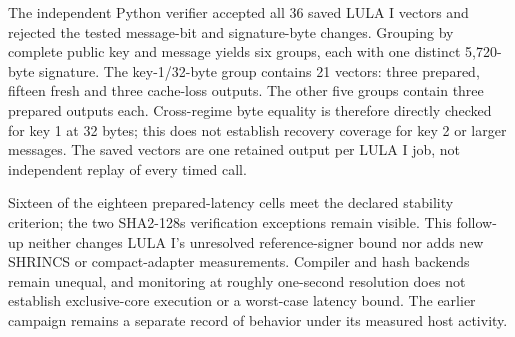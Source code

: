 The independent Python verifier accepted all 36 saved LULA I vectors and rejected the tested message-bit and signature-byte changes. Grouping by complete public key and message yields six groups, each with one distinct 5,720-byte signature. The key-1/32-byte group contains 21 vectors: three prepared, fifteen fresh and three cache-loss outputs. The other five groups contain three prepared outputs each. Cross-regime byte equality is therefore directly checked for key 1 at 32 bytes; this does not establish recovery coverage for key 2 or larger messages. The saved vectors are one retained output per LULA I job, not independent replay of every timed call.

Sixteen of the eighteen prepared-latency cells meet the declared stability criterion; the two SHA2-128s verification exceptions remain visible. This follow-up neither changes LULA I's unresolved reference-signer bound nor adds new SHRINCS or compact-adapter measurements. Compiler and hash backends remain unequal, and monitoring at roughly one-second resolution does not establish exclusive-core execution or a worst-case latency bound. The earlier campaign remains a separate record of behavior under its measured host activity.
